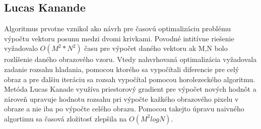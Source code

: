 \subsection{Lucas Kanande}
Algoritmus prvotne vznikol ako návrh pre časovú optimalizáciu problému výpočtu vektoru posunu medzi dvomi krivkami.
Povodné intitívne riešenie vyžadovalo \begin{math} O(M^2 * N^2) \end{math} času pre výpočet daného vektoru ak M,N bolo rozlíšenie daného obrazového vzoru.
Vtedy nahvrhovaná optimalizácia vyžadovala zadanie rozsahu hladania, pomocou ktorého sa vypočítali diferencie pre celý obraz a pre ďalšiu iteráciu sa rozsah vypočítal pomocou horolezeckého algoritmu.
Metóda Lucas Kanade využíva priestorový gradient pre výpočet nových hodnôt a zároveň upravuje hodnotu rozsahu pri výpočte kažkého obrazového pixelu v obraze a nie iba po výpočte celého obrazu.
Pomocou takejto úpravu naivného algortimu sa časová zložitosť zlepšila na \begin{math} O(M^2 log N) \end{math}\cite{lucas-kanade}.


